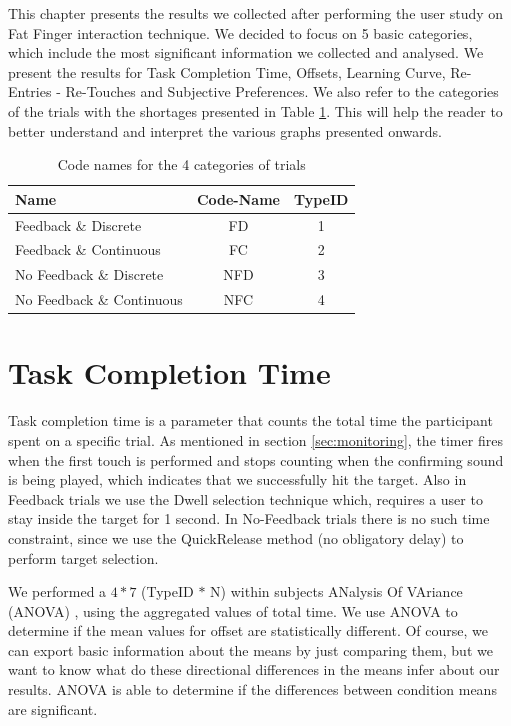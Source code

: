 This chapter presents the results we collected after performing the user study on Fat Finger interaction technique. We decided to focus on 5 basic categories, which include the most significant information we collected and analysed. We present the results for Task Completion Time, Offsets, Learning Curve, Re-Entries - Re-Touches and Subjective Preferences. We also refer to the categories of the trials with the shortages presented in Table \ref{tab:typeIDnames}. This will help the reader to better understand and interpret the various graphs presented onwards.

\begin{table}[H]
\centering
\begin{tabular}{l || c || c }
Name & Code-Name & TypeID \\
\hline
\hline
Feedback \& Discrete & FD & 1 \\
Feedback \& Continuous & FC & 2 \\
No Feedback \& Discrete & NFD & 3 \\
No Feedback \& Continuous & NFC & 4 \\
\end{tabular}
\caption{Code names for the 4 categories of trials}
\label{tab:typeIDnames}
\end{table}


\section{Task Completion Time}
\label{sec:resultsTaskCompletionTime}

Task completion time is a parameter that counts the total time the participant spent on a specific trial. As mentioned in section \ref{sec:monitoring}, the timer fires when the first touch is performed and stops counting when the confirming sound is being played, which indicates that we successfully hit the target. Also in Feedback trials we use the Dwell selection technique which, requires a user to stay inside the target for 1 second. In No-Feedback trials there is no such time constraint, since we use the QuickRelease method (no obligatory delay) to perform target selection. 

We performed a $4 * 7$ (TypeID $*$ N) within subjects ANalysis Of VAriance (ANOVA) \cite{anova}, using the aggregated values of total time. We use ANOVA to determine if the mean values for offset are statistically different. Of course, we can export basic information about the means by just comparing them, but we want to know what do these directional differences in the means infer about our results. ANOVA is able to determine if the differences between condition means are significant.

